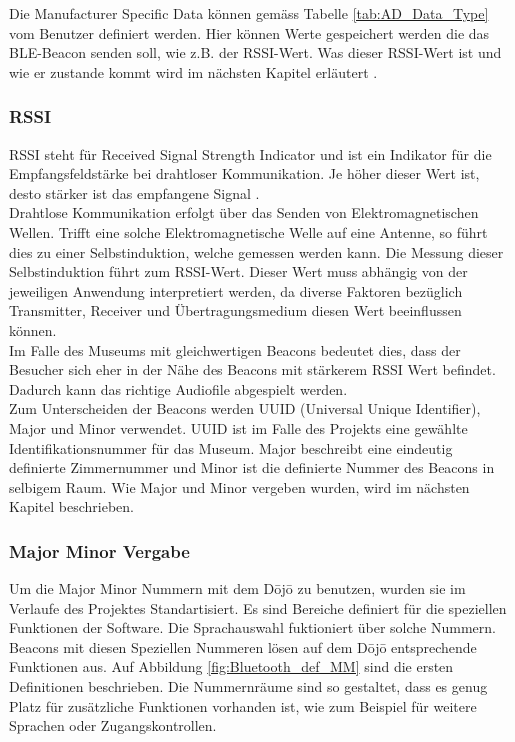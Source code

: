 Die Manufacturer Specific Data können gemäss Tabelle \ref{tab:AD_Data_Type} vom Benutzer definiert werden. Hier können Werte gespeichert werden die das BLE-Beacon senden soll, wie z.B. der RSSI-Wert. Was dieser RSSI-Wert ist und wie er zustande kommt wird im nächsten Kapitel erläutert \cite{9_Teildokument_BT}.\\

\subsubsection{RSSI}
RSSI steht für Received Signal Strength Indicator und ist ein Indikator für die Empfangsfeldstärke bei drahtloser Kommunikation. Je höher dieser Wert ist, desto stärker ist das empfangene Signal \cite{10_Teildokument_BT}.\\[0.25cm] 
Drahtlose Kommunikation erfolgt über das Senden von Elektromagnetischen Wellen. Trifft eine solche Elektromagnetische Welle auf eine Antenne, so führt dies zu einer Selbstinduktion, welche gemessen werden kann. Die Messung dieser Selbstinduktion führt zum RSSI-Wert. Dieser Wert muss abhängig von der jeweiligen Anwendung interpretiert werden, da diverse Faktoren bezüglich Transmitter, Receiver und Übertragungsmedium diesen Wert beeinflussen können.\\[0.25cm]
Im Falle des Museums mit gleichwertigen Beacons bedeutet dies, dass der Besucher sich eher in der Nähe des Beacons mit stärkerem RSSI Wert befindet. Dadurch kann das richtige Audiofile abgespielt werden.\\[0.25cm]
Zum Unterscheiden der Beacons werden UUID (Universal Unique Identifier), Major und Minor verwendet. UUID ist im Falle des Projekts eine gewählte Identifikationsnummer für das Museum. Major beschreibt eine eindeutig definierte Zimmernummer und Minor ist die definierte Nummer des Beacons in selbigem Raum. Wie Major und Minor vergeben wurden, wird im nächsten Kapitel beschrieben.\\

\subsubsection{Major Minor Vergabe}
Um die Major Minor Nummern mit dem Dōjō zu benutzen, wurden sie im Verlaufe des Projektes Standartisiert. Es sind Bereiche definiert für die speziellen Funktionen der Software. Die Sprachauswahl fuktioniert über solche Nummern. Beacons mit diesen Speziellen Nummeren lösen auf dem Dōjō entsprechende Funktionen aus. Auf Abbildung \ref{fig:Bluetooth_def_MM} sind die ersten Definitionen beschrieben. Die Nummernräume sind so gestaltet, dass es genug Platz für zusätzliche Funktionen vorhanden ist, wie zum Beispiel für weitere Sprachen oder Zugangskontrollen.

